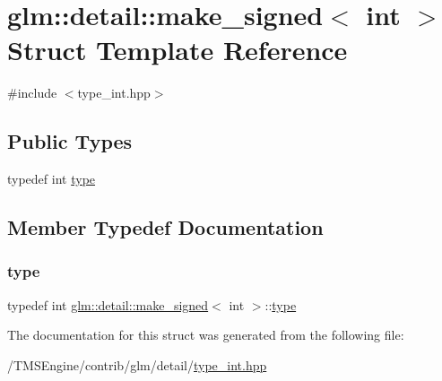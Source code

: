 \hypertarget{structglm_1_1detail_1_1make__signed_3_01int_01_4}{}\section{glm\+:\+:detail\+:\+:make\+\_\+signed$<$ int $>$ Struct Template Reference}
\label{structglm_1_1detail_1_1make__signed_3_01int_01_4}


{\ttfamily \#include $<$type\+\_\+int.\+hpp$>$}

\subsection*{Public Types}
\begin{DoxyCompactItemize}
\item 
typedef int \hyperlink{structglm_1_1detail_1_1make__signed_3_01int_01_4_a69085e97a5044d1985cdc2116eb6ea9b}{type}
\end{DoxyCompactItemize}


\subsection{Member Typedef Documentation}
\mbox{\label{structglm_1_1detail_1_1make__signed_3_01int_01_4_a69085e97a5044d1985cdc2116eb6ea9b}} 
\subsubsection{\texorpdfstring{type}{type}}
{\footnotesize\ttfamily typedef int \hyperlink{structglm_1_1detail_1_1make__signed}{glm\+::detail\+::make\+\_\+signed}$<$ int $>$\+::\hyperlink{structglm_1_1detail_1_1make__signed_3_01int_01_4_a69085e97a5044d1985cdc2116eb6ea9b}{type}}



The documentation for this struct was generated from the following file\+:\begin{DoxyCompactItemize}
\item 
/\+T\+M\+S\+Engine/contrib/glm/detail/\hyperlink{type__int_8hpp}{type\+\_\+int.\+hpp}\end{DoxyCompactItemize}
